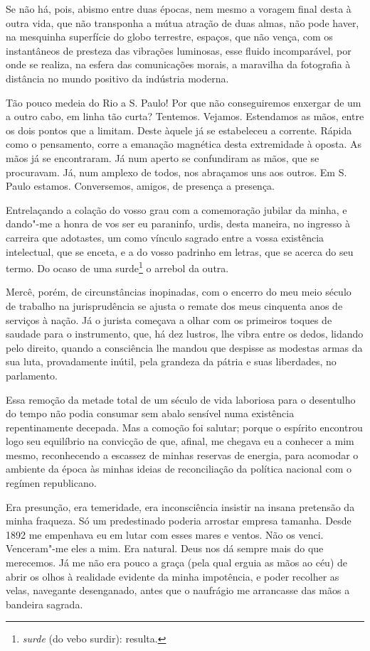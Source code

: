 Se não há, pois, abismo entre duas épocas, nem mesmo a voragem
final desta à outra vida, que não transponha a mútua atração de duas
almas, não pode haver, na mesquinha superfície do globo terrestre,
espaços, que não vença, com os instantâneos de presteza das vibrações
luminosas, esse fluido incomparável, por onde se realiza, na esfera das
comunicações morais, a maravilha da fotografia à distância no mundo
positivo da indústria moderna.

Tão pouco medeia do Rio a S. Paulo! Por que não conseguiremos
enxergar de um a outro cabo, em linha tão curta? Tentemos. Vejamos.
Estendamos as mãos, entre os dois pontos que a limitam. Deste àquele já
se estabeleceu a corrente. Rápida como o pensamento, corre a emanação
magnética desta extremidade à oposta. As mãos já se encontraram. Já num
aperto se confundiram as mãos, que se procuravam. Já, num amplexo de
todos, nos abraçamos uns aos outros. Em S. Paulo estamos. Conversemos,
amigos, de presença a presença.

Entrelaçando a colação do vosso grau com a comemoração jubilar da
minha, e dando"-me a honra de vos ser eu paraninfo, urdis, desta
maneira, no ingresso à carreira que adotastes, um como vínculo sagrado
entre a vossa existência intelectual, que se enceta, e a do vosso
padrinho em letras, que se acerca do seu termo. Do ocaso
de uma surde\footnote{ \textit{surde} (do vebo surdir): resulta.} o arrebol da outra.

Mercê, porém, de circunstâncias inopinadas, com o encerro do meu
meio século de trabalho na jurisprudência se ajusta o remate dos meus
cinquenta anos de serviços à nação. Já o jurista começava a olhar com
os primeiros toques de saudade para o instrumento, que, há dez lustros,
lhe vibra entre os dedos, lidando pelo direito, quando a consciência
lhe mandou que despisse as modestas armas da sua luta, provadamente
inútil, pela grandeza da pátria e suas liberdades, no parlamento.

Essa remoção da metade total de um século de vida laboriosa para o
desentulho do tempo não podia consumar sem abalo sensível numa
existência repentinamente decepada. Mas a comoção foi salutar; porque o
espírito encontrou logo seu equilíbrio na convicção de que, afinal, me
chegava eu a conhecer a mim mesmo, reconhecendo a escassez de minhas
reservas de energia, para acomodar o ambiente da época às minhas ideias
de reconciliação da política nacional com o regímen republicano.

Era presunção, era temeridade, era inconsciência insistir na
insana pretensão da minha fraqueza. Só um predestinado poderia arrostar
empresa tamanha. Desde 1892 me empenhava eu em lutar com esses mares e
ventos. Não os venci. Venceram"-me eles a mim. Era natural. Deus nos dá
sempre mais do que merecemos. Já me não era pouco a graça (pela qual
erguia as mãos ao céu) de abrir os olhos à realidade evidente da minha
impotência, e poder recolher as velas, navegante desenganado, antes que
o naufrágio me arrancasse das mãos a bandeira sagrada.

